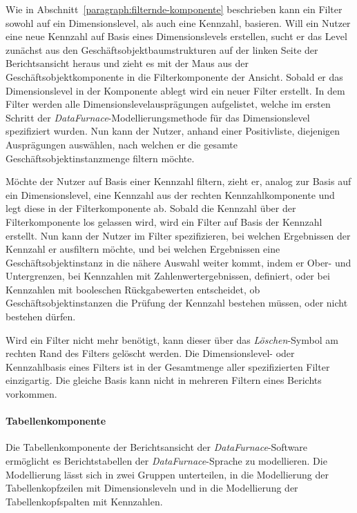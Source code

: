 \documentclass[
  language=german, %
  type=bachelor%
]{isthesis}
\begin{document}
\begin{content}
  Wie in Abschnitt~\ref{paragraph:filternde-komponente}
  beschrieben kann ein Filter sowohl auf ein Dimensionslevel, als auch eine
  Kennzahl, basieren. Will ein Nutzer eine neue Kennzahl auf Basis eines
  Dimensionslevels erstellen, sucht er das Level zunächst aus den
  Geschäftsobjektbaumstrukturen auf der linken Seite der Berichtsansicht heraus
  und zieht es mit der Maus aus der Geschäftsobjektkomponente in die
  Filterkomponente der Ansicht. Sobald er das Dimensionslevel in der Komponente
  ablegt wird ein neuer Filter erstellt. In dem Filter werden alle
  Dimensionslevelausprägungen aufgelistet, welche im ersten Schritt der
  \textit{DataFurnace}-Modellierungsmethode für das Dimensionslevel
  spezifiziert wurden. Nun kann der Nutzer, anhand einer Positivliste,
  diejenigen Ausprägungen auswählen, nach welchen er die gesamte
  Geschäftsobjektinstanzmenge filtern möchte.

  Möchte der Nutzer auf Basis einer Kennzahl filtern, zieht er, analog zur
  Basis auf ein Dimensionslevel, eine Kennzahl aus der rechten
  Kennzahlkomponente und legt diese in der Filterkomponente ab. Sobald die
  Kennzahl über der Filterkomponente los gelassen wird, wird ein Filter auf
  Basis der Kennzahl erstellt. Nun kann der Nutzer im Filter spezifizieren, bei
  welchen Ergebnissen der Kennzahl er ausfiltern möchte, und bei welchen
  Ergebnissen eine Geschäftsobjektinstanz in die nähere Auswahl weiter kommt,
  indem er \zB{} Ober- und Untergrenzen, bei Kennzahlen mit
  Zahlenwertergebnissen, definiert, oder bei Kennzahlen mit booleschen
  Rückgabewerten entscheidet, ob Geschäftsobjektinstanzen die Prüfung der
  Kennzahl bestehen müssen, oder nicht bestehen dürfen.

  Wird ein Filter nicht mehr benötigt, kann dieser über das
  \textit{Löschen}-Symbol am rechten Rand des Filters gelöscht werden. Die
  Dimensionslevel- oder Kennzahlbasis eines Filters ist in der Gesamtmenge
  aller spezifizierten Filter einzigartig. Die gleiche Basis kann nicht in
  mehreren Filtern eines Berichts vorkommen.

  \paragraph{Tabellenkomponente}

  Die Tabellenkomponente der Berichtsansicht der \textit{DataFurnace}-Software
  ermöglicht es Berichtstabellen der \textit{DataFurnace}-Sprache zu
  modellieren. Die Modellierung lässt sich in zwei Gruppen unterteilen, in die
  Modellierung der Tabellenkopfzeilen mit Dimensionsleveln und in die
  Modellierung der Tabellenkopfspalten mit Kennzahlen.


\end{content}
\end{document}
